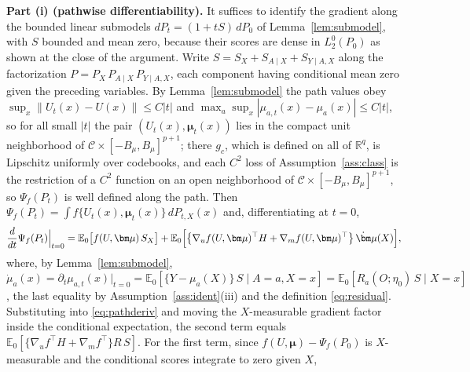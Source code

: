 \documentclass[11pt]{article}
\newcommand{\E}{\mathbb E}
\newcommand{\R}{\mathbb R}
\newcommand{\calC}{\mathcal C}
\newcommand{\bmu}{\bm\mu}
\newcommand{\norm}[1]{\lVert #1\rVert}
\begin{document}
\textbf{Part (i) (pathwise differentiability).}
It suffices to identify the gradient along the bounded linear submodels $dP_t=(1+tS)\,dP_0$ of Lemma~\ref{lem:submodel}, with $S$ bounded and mean zero, because their scores are dense in $L_2^0(P_0)$ as shown at the close of the argument. Write $S=S_X+S_{A\mid X}+S_{Y\mid A,X}$ along the factorization $P=P_X\,P_{A\mid X}\,P_{Y\mid A,X}$, each component having conditional mean zero given the preceding variables. By Lemma~\ref{lem:submodel} the path values obey $\sup_x\norm{U_t(x)-U(x)}\le C|t|$ and $\max_a\sup_x|\mu_{a,t}(x)-\mu_a(x)|\le C|t|$, so for all small $|t|$ the pair $(U_t(x),\bmu_t(x))$ lies in the compact unit neighborhood of $\calC\times[-B_\mu,B_\mu]^{p+1}$; there $g_c$, which is defined on all of $\R^q$, is Lipschitz uniformly over codebooks, and each $C^2$ loss of Assumption~\ref{ass:class} is the restriction of a $C^2$ function on an open neighborhood of $\calC\times[-B_\mu,B_\mu]^{p+1}$, so $\Psi_f(P_t)$ is well defined along the path. Then $\Psi_f(P_t)=\int f\{U_t(x),\bmu_t(x)\}\,dP_{t,X}(x)$ and, differentiating at $t=0$,
\begin{equation}\label{eq:pathderiv}
\frac{d}{dt}\Psi_f(P_t)\Big|_{t=0}
=\E_0\bigl[f(U,\bmu)\,S_X\bigr]
+\E_0\Bigl[\bigl\{\nabla_uf(U,\bmu)^\top H+\nabla_mf(U,\bmu)^\top\bigr\}\,\dot\bmu(X)\Bigr],
\end{equation}
where, by Lemma~\ref{lem:submodel}, $\dot\mu_a(x)=\partial_t\mu_{a,t}(x)|_{t=0}=\E_0[\{Y-\mu_a(X)\}\,S\mid A=a,X=x]=\E_0[R_a(O;\eta_0)\,S\mid X=x]$, the last equality by Assumption~\ref{ass:ident}(iii) and the definition \eqref{eq:residual}. Substituting into \eqref{eq:pathderiv} and moving the $X$-measurable gradient factor inside the conditional expectation, the second term equals $\E_0[\{\nabla_uf^\top H+\nabla_mf^\top\}R\,S]$. For the first term, since $f(U,\bmu)-\Psi_f(P_0)$ is $X$-measurable and the conditional scores integrate to zero given $X$,
\end{document}
